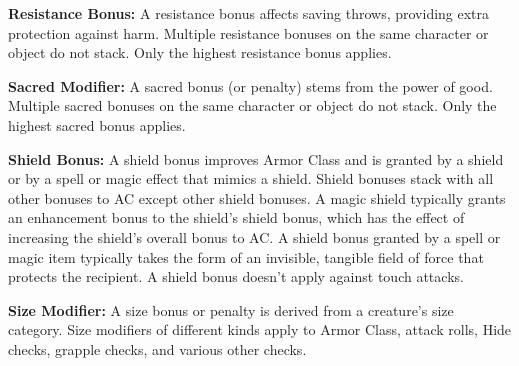 \textbf{Resistance Bonus:} A resistance bonus affects saving throws, providing extra protection against harm. Multiple resistance bonuses on the same character or object do not stack. Only the highest resistance bonus applies.

\textbf{Sacred Modifier:} A sacred bonus (or penalty) stems from the power of good. Multiple sacred bonuses on the same character or object do not stack. Only the highest sacred bonus applies.

\textbf{Shield Bonus:} A shield bonus improves Armor Class and is granted by a shield or by a spell or magic effect that mimics a shield. Shield bonuses stack with all other bonuses to AC except other shield bonuses. A magic shield typically grants an enhancement bonus to the shield's shield bonus, which has the effect of increasing the shield's overall bonus to AC. A shield bonus granted by a spell or magic item typically takes the form of an invisible, tangible field of force that protects the recipient. A shield bonus doesn't apply against touch attacks.

\textbf{Size Modifier:} A size bonus or penalty is derived from a creature's size category. Size modifiers of different kinds apply to Armor Class, attack rolls, Hide checks, grapple checks, and various other checks.
